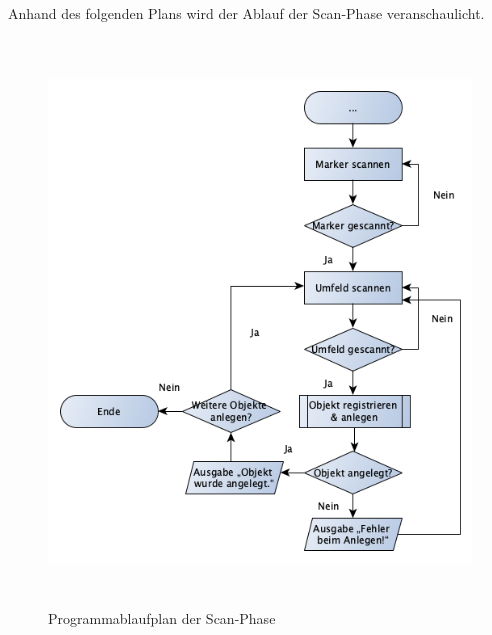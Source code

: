 \\ 
Anhand des folgenden Plans wird der Ablauf der Scan-Phase veranschaulicht.
\begin{figure}[hbt!]
    \centering
    \includegraphics[width=15cm,height=15cm,keepaspectratio]{4Umsetzung/Bilder/scanPAP.png}
    \caption{Programmablaufplan der Scan-Phase}
    \label{pic:startmenu}
\end{figure}